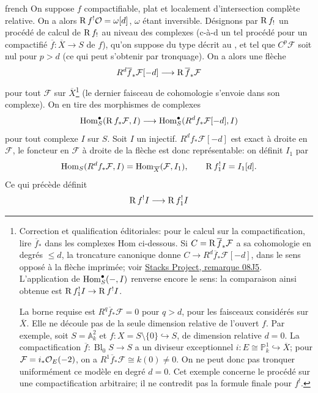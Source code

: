 \begin{hyphenrules}{french}
On suppose $f$ compactifiable, plat et localement d'intersection compl\`ete relative. On a alors $\operatorname{R} f^{!}\mathcal{O} = \omega[d]$, $\omega$ \'etant inversible. D\'esignons par $\operatorname{R} f_{!}$ un proc\'ed\'e de calcul de $\operatorname{R} f_{!}$ au niveau des complexes (c-\`a-d un tel proc\'ed\'e pour un compactifi\'e $\overline{f}: \overline{X} \to S$ de $f$), qu'on suppose du type d\'ecrit au , et tel que $C^{p}\mathcal{F}$ soit nul pour $p > d$ (ce qui peut s'obtenir par tronquage). On a alors une fl\`eche
\[
R^{d}\overline{f}_{*}\mathcal{F}[-d]
 \longrightarrow \operatorname{R}\overline{f}_{*}\mathcal{F}
\]
pour tout $\mathcal{F}$ sur $\overline X$\footnote{Correction et qualification \'editoriales: pour le calcul sur la compactification, lire $\overline f_*$ dans les complexes Hom ci-dessous. Si $C=\operatorname{R}\overline f_*\mathcal F$ a sa cohomologie en degr\'es $\leq d$, la troncature canonique donne $C\to R^d\overline f_*\mathcal F[-d]$, dans le sens oppos\'e \`a la fl\`eche imprim\'ee; voir \href{https://stacks.math.columbia.edu/tag/08J5}{Stacks Project, remarque 08J5}. L'application de $\operatorname{Hom}_S^{\bullet}(-,I)$ renverse encore le sens: la comparaison ainsi obtenue est $\operatorname{R} f_1^!I\to\operatorname{R} f^!I$.
\par La borne requise est $R^q\overline f_*\mathcal F=0$ pour $q>d$, pour les faisceaux consid\'er\'es sur $\overline X$. Elle ne d\'ecoule pas de la seule dimension relative de l'ouvert $f$. Par exemple, soit $S=\mathbb A_k^2$ et $f:X=S\setminus\{0\}\hookrightarrow S$, de dimension relative $d=0$. La compactification $\overline f:\operatorname{Bl}_0 S\to S$ a un diviseur exceptionnel $i:E\cong\mathbb P_k^1\hookrightarrow\overline X$; pour $\mathcal F=i_*\mathcal{O}_E(-2)$, on a $R^1\overline f_*\mathcal F\cong k(0)\ne0$. On ne peut donc pas tronquer uniform\'ement ce mod\`ele en degr\'e $d=0$. Cet exemple concerne le proc\'ed\'e sur une compactification arbitraire; il ne contredit pas la formule finale pour $f^!$.} (le dernier faisceau de cohomologie s'envoie dans son complexe). On en tire des morphismes de complexes
\[
\operatorname{Hom}_{S}^{\bullet}(\operatorname{R} f_{*}\mathcal{F}, I)
 \longrightarrow
\operatorname{Hom}_{S}^{\bullet}(R^{d}f_{*}\mathcal{F}[-d], I)
\]
pour tout complexe $I$ sur $S$. Soit $I$ un injectif. $R^{d}f_{*}\mathcal{F}[-d]$ est exact \`a droite en $\mathcal{F}$, le foncteur en $\mathcal{F}$ \`a droite de la fl\`eche est donc repr\'esentable: on d\'efinit $I_1$ par
\[
\operatorname{Hom}_{S}(R^{d}f_{*}\mathcal{F}, I)
 = \operatorname{Hom}_{\overline X}(\mathcal{F}, I_1),
 \qquad \operatorname{R} f_{1}^{!}I = I_1[d].
\]
Ce qui pr\'ec\`ede d\'efinit
\[
\operatorname{R} f^{!}I \longrightarrow \operatorname{R} f_{1}^{!}I
\]
\end{hyphenrules}
